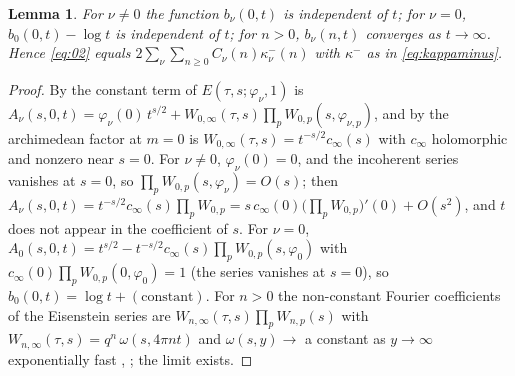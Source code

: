 \documentclass[11pt,reqno]{amsart}
\theoremstyle{plain}
\newtheorem{lemma}[theorem]{Lemma}
\theoremstyle{definition}
\begin{document}
\begin{lemma}\label{lem:bconst}
For $\nu\neq0$ the function $b_\nu(0,t)$ is independent of $t$; for $\nu=0$, $b_0(0,t)-\log t$ is
independent of $t$; for $n>0$, $b_\nu(n,t)$ converges as $t\to\infty$. Hence \eqref{eq:02} equals
$2\sum_{\nu}\sum_{n\ge0}C_\nu(n)\kappa^-_\nu(n)$ with $\kappa^-$ as in \eqref{eq:kappaminus}.
\end{lemma}
\begin{proof}
By \cite[Thm.~2.4]{KY} the constant term of $E(\tau,s;\varphi_\nu,1)$ is
$A_\nu(s,0,t)=\varphi_\nu(0)\,t^{s/2}+W_{0,\infty}(\tau,s)\prod_pW_{0,p}(s,\varphi_{\nu,p})$, and by
\cite[Prop.~2.3]{KY} the archimedean factor at $m=0$ is $W_{0,\infty}(\tau,s)=t^{-s/2}c_\infty(s)$
with $c_\infty$ holomorphic and nonzero near $s=0$. For $\nu\neq0$, $\varphi_\nu(0)=0$, and the
incoherent series vanishes at $s=0$, so $\prod_pW_{0,p}(s,\varphi_\nu)=O(s)$; then
$A_\nu(s,0,t)=t^{-s/2}c_\infty(s)\prod_pW_{0,p}=s\,c_\infty(0)\bigl(\prod_pW_{0,p}\bigr)'(0)+O(s^2)$,
and $t$ does not appear in the coefficient of $s$. For $\nu=0$, $A_0(s,0,t)=t^{s/2}-t^{-s/2}
c_\infty(s)\prod_pW_{0,p}(s,\varphi_0)$ with $c_\infty(0)\prod_pW_{0,p}(0,\varphi_0)=1$ (the series
vanishes at $s=0$), so $b_0(0,t)=\log t+(\text{constant})$. For $n>0$ the non-constant Fourier
coefficients of the Eisenstein series are $W_{n,\infty}(\tau,s)\prod_pW_{n,p}(s)$ with
$W_{n,\infty}(\tau,s)=q^n\,\omega(s,4\pi nt)$ and $\omega(s,y)\to$ a constant as $y\to\infty$
exponentially fast \cite[Prop.~2.3]{KY}, \cite[Lemma~2.20]{Schofer}; the limit exists.
\end{proof}
\end{document}
